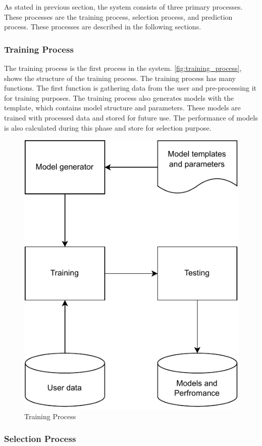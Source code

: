 As stated in previous section, the system consists of three primary processes. These processes are the training process, selection process, and prediction process. These processes are described in the following sections.

\subsubsection{Training Process}\label{subsubsec:training_process}

The training process is the first process in the system. \autoref{fig:training_process}, shows the structure of the training process. The training process has many functions. The first function is gathering data from the user and pre-processing it for training purposes. The training process also generates models with the template, which contains model structure and parameters. These models are trained with processed data and stored for future use. The performance of models is also calculated during this phase and store for selection purpose.

\begin{figure}[ht]
    \centering
    \includegraphics[width=0.6\columnwidth]{media/sec03/training_and_testing.pdf}
    \caption{Training Process}
    \label{fig:training_process}
\end{figure}

\subsubsection{Selection Process}\label{subsubsec:selection_process}

